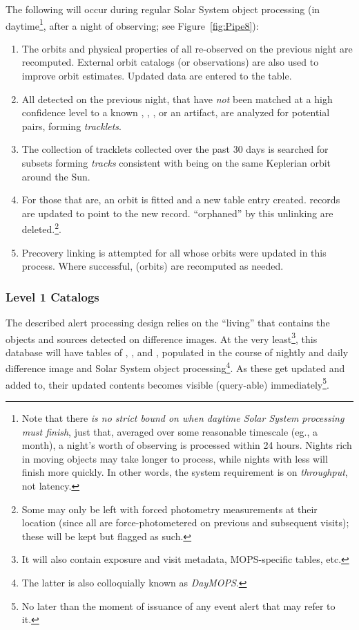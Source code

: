The following will occur during regular Solar System object processing (in daytime\footnote{Note that there {\em is no strict bound on when daytime Solar System processing must finish}, just that, averaged over some reasonable timescale (eg., a month), a night's worth of observing is processed within 24 hours. Nights rich in moving objects may take longer to process, while nights with less will finish more quickly. In other words, the system requirement is on {\em throughput}, not latency.}, after a night of observing; see Figure~\ref{fig:Pipe8}):
\begin{enumerate}
\item The orbits and physical properties of all \SSObjects re-observed on the previous night are recomputed. External orbit catalogs (or observations) are also used to improve orbit estimates. Updated data are entered to the \SSObjects table. 
\item All \DIASources detected on the previous night, that have {\em not} been matched at a high confidence level to a known \Object,
\DIAObject, \SSObject, or an artifact, are analyzed for potential pairs, forming {\em tracklets}.
\item The collection of tracklets collected over the past 30 days is searched for subsets forming {\em tracks} consistent with being on the same Keplerian orbit around the Sun.
\item For those that are, an orbit is fitted and a new \SSObject table entry created. \DIASource records are updated to point to the new \SSObject record. \DIAObjects ``orphaned'' by this unlinking are deleted.\footnote{Some \DIAObjects may only be left with forced photometry measurements at their location (since all \DIAObjects are force-photometered on previous and subsequent visits);  these will be kept but flagged as such.}.
\item Precovery linking is attempted for all \SSObjects whose orbits were updated in this process. Where successful, \SSObjects (orbits) are recomputed as needed.
\end{enumerate}


\subsubsection{Level 1 Catalogs}
\label{sec:level1db}

The described alert processing design relies on the ``living'' \DB that contains the objects and sources detected on difference images. At the very least\footnote{It will also contain exposure and visit metadata, MOPS-specific tables, etc.}, this database will have tables of \DIASources, \DIAObjects, and \SSObjects, populated in the course of nightly and daily difference image and Solar System object processing\footnote{The latter is also colloquially known as {\em DayMOPS}.}. As these get updated and added to, their updated contents becomes visible (query-able) immediately\footnote{No later than the moment of issuance of any event alert that may refer to it.}.

